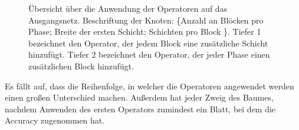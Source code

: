  \begin{figure}
     \centering
     \subfloat[][]{
     \label{abb:deeperRoom1}}
     \caption{Übersicht über die Anwendung der Operatoren auf das Ausgangsnetz. Beschriftung der Knoten: \{Anzahl an Blöcken pro Phase; Breite der ersten Schicht; Schichten pro Block \}. Tiefer 1 bezeichnet den Operator, der jedem Block eine zusätzliche Schicht hinzufügt. Tiefer 2 bezeichnet den Operator, der jeder Phase einen zusätzlichen Block hinzufügt.}
     \hfill
\end{figure}

Es fällt auf, dass die Reihenfolge, in welcher die Operatoren angewendet werden einen großen Unterschied machen. Außerdem hat jeder Zweig des Baumes, nachdem Anwenden des ersten Operators zumindest ein Blatt, bei dem die Accuracy zugenommen hat.

